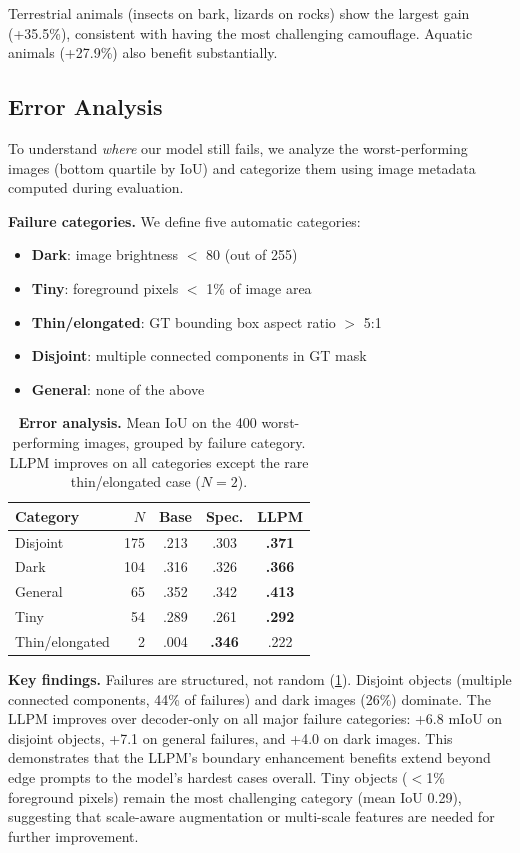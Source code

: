 Terrestrial animals (insects on bark, lizards on rocks) show the largest gain (+35.5\%), consistent with having the most challenging camouflage. Aquatic animals (+27.9\%) also benefit substantially.

\subsection{Error Analysis}
\label{sec:error_analysis}

To understand \emph{where} our model still fails, we analyze the worst-performing images (bottom quartile by IoU) and categorize them using image metadata computed during evaluation.

\noindent\textbf{Failure categories.} We define five automatic categories:
\begin{itemize}
    \item \textbf{Dark}: image brightness $<$ 80 (out of 255)
    \item \textbf{Tiny}: foreground pixels $<$ 1\% of image area
    \item \textbf{Thin/elongated}: GT bounding box aspect ratio $>$ 5:1
    \item \textbf{Disjoint}: multiple connected components in GT mask
    \item \textbf{General}: none of the above
\end{itemize}

\begin{table}[t]
\centering
\caption{\textbf{Error analysis.} Mean IoU on the 400 worst-performing images, grouped by failure category. LLPM improves on all categories except the rare thin/elongated case ($N\!=\!2$).}
\label{tab:error_analysis}
\small
\begin{tabular}{lrccc}
\toprule
Category & $N$ & Base & Spec. & LLPM \\
\midrule
Disjoint & 175 & .213 & .303 & \textbf{.371} \\
Dark & 104 & .316 & .326 & \textbf{.366} \\
General & 65 & .352 & .342 & \textbf{.413} \\
Tiny & 54 & .289 & .261 & \textbf{.292} \\
Thin/elongated & 2 & .004 & \textbf{.346} & .222 \\
\bottomrule
\end{tabular}
\end{table}

\noindent\textbf{Key findings.}
Failures are structured, not random (\cref{tab:error_analysis}). Disjoint objects (multiple connected components, 44\% of failures) and dark images (26\%) dominate. The LLPM improves over decoder-only on all major failure categories: +6.8 mIoU on disjoint objects, +7.1 on general failures, and +4.0 on dark images. This demonstrates that the LLPM's boundary enhancement benefits extend beyond edge prompts to the model's hardest cases overall. Tiny objects ($<$1\% foreground pixels) remain the most challenging category (mean IoU 0.29), suggesting that scale-aware augmentation or multi-scale features are needed for further improvement.

